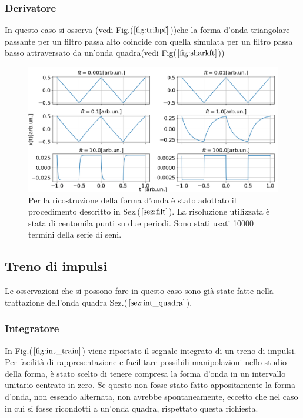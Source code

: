 \documentclass{article}
\begin{document}
        \subsubsection{Derivatore}
            In questo caso si osserva (vedi Fig.($\ref{fig:trihpf}$))che la forma d'onda 
            triangolare passante per un filtro passa alto coincide con quella simulata 
            per un filtro passa basso attraversato da un'onda quadra(vedi Fig($\ref{fig:sharkft}$))
                \begin{figure}[H]
                    \centering
                    \includegraphics[width=1\textwidth]{der_trian.png} %
                    \caption{Per la ricostruzione della forma d'onda è stato adottato 
                    il procedimento descritto in Sez.($\ref{sez:filt}$).
                    La risoluzione utilizzata è stata di centomila punti su due periodi.
                    Sono stati usati 10000 termini della serie di seni.}
                    \label{fig:trihpf}
                \end{figure}


    \subsection{Treno di impulsi}
                Le osservazioni che si possono fare in questo caso sono già state fatte 
                nella trattazione dell'onda quadra Sez.($\ref{sez:int_quadra}$).
            \subsubsection{Integratore}
                In Fig.($\ref{fig:int_train}$) viene riportato il segnale integrato di un treno di impulsi.
                Per facilità di rappresentazione e facilitare possibili manipolazioni
                nello studio della forma, è stato scelto di tenere compresa la forma 
                d'onda in un intervallo unitario centrato in zero.
                Se questo non fosse stato fatto appositamente la forma d'onda, non 
                essendo alternata, non avrebbe spontaneamente, eccetto che nel caso 
                in cui si fosse ricondotti a un'onda quadra, rispettato questa richiesta.
        
\end{document}

